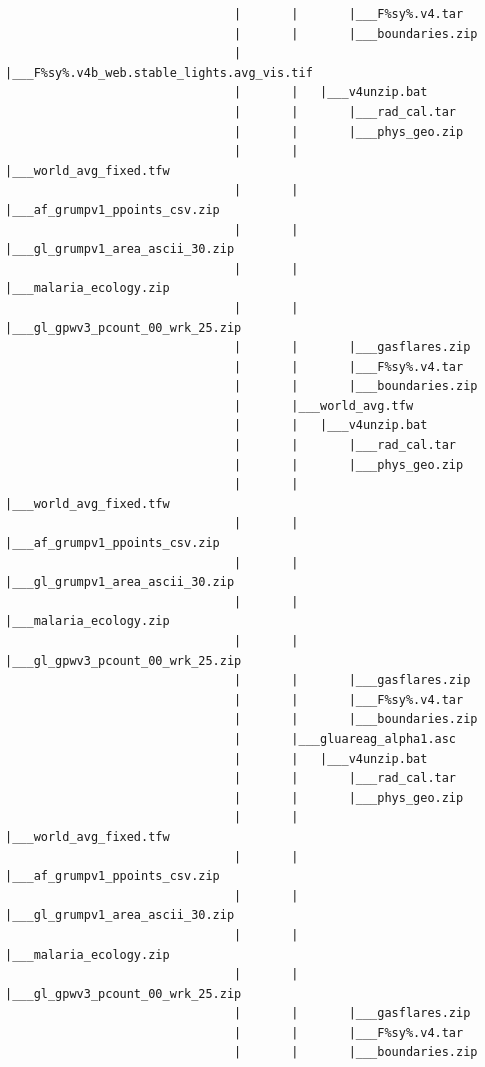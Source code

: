 \documentclass[]{book}
\begin{document}
\begin{verbatim}
                                |       |       |___F%sy%.v4.tar
                                |       |       |___boundaries.zip
                                |       |___F%sy%.v4b_web.stable_lights.avg_vis.tif
                                |       |   |___v4unzip.bat
                                |       |       |___rad_cal.tar
                                |       |       |___phys_geo.zip
                                |       |       |___world_avg_fixed.tfw
                                |       |       |___af_grumpv1_ppoints_csv.zip
                                |       |       |___gl_grumpv1_area_ascii_30.zip
                                |       |       |___malaria_ecology.zip
                                |       |       |___gl_gpwv3_pcount_00_wrk_25.zip
                                |       |       |___gasflares.zip
                                |       |       |___F%sy%.v4.tar
                                |       |       |___boundaries.zip
                                |       |___world_avg.tfw
                                |       |   |___v4unzip.bat
                                |       |       |___rad_cal.tar
                                |       |       |___phys_geo.zip
                                |       |       |___world_avg_fixed.tfw
                                |       |       |___af_grumpv1_ppoints_csv.zip
                                |       |       |___gl_grumpv1_area_ascii_30.zip
                                |       |       |___malaria_ecology.zip
                                |       |       |___gl_gpwv3_pcount_00_wrk_25.zip
                                |       |       |___gasflares.zip
                                |       |       |___F%sy%.v4.tar
                                |       |       |___boundaries.zip
                                |       |___gluareag_alpha1.asc
                                |       |   |___v4unzip.bat
                                |       |       |___rad_cal.tar
                                |       |       |___phys_geo.zip
                                |       |       |___world_avg_fixed.tfw
                                |       |       |___af_grumpv1_ppoints_csv.zip
                                |       |       |___gl_grumpv1_area_ascii_30.zip
                                |       |       |___malaria_ecology.zip
                                |       |       |___gl_gpwv3_pcount_00_wrk_25.zip
                                |       |       |___gasflares.zip
                                |       |       |___F%sy%.v4.tar
                                |       |       |___boundaries.zip

\end{verbatim}
\end{document}

